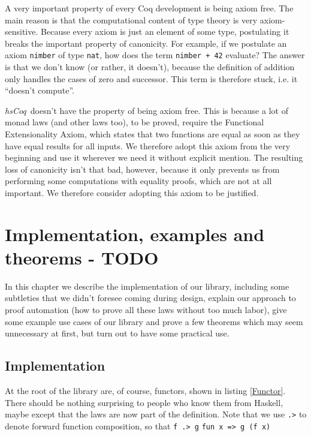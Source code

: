 \documentclass[declaration,inz,english,shortabstract]{iithesis}
\newcommand{\libname}{\textit{hsCoq}}
\newcommand{\m}[1]{\texttt{#1}}
\begin{document}
A very important property of every Coq development is being axiom free. The main reason is that the computational content of type theory is very axiom-sensitive. Because every axiom is just an element of some type, postulating it breaks the important property of canonicity. For example, if we postulate an axiom \m{nimber} of type \m{nat}, how does the term \m{nimber + 42} evaluate? The answer is that we don't know (or rather, it doesn't), because the definition of addition only handles the cases of zero and successor. This term is therefore stuck, i.e. it ``doesn't compute''.

\libname\ doesn't have the property of being axiom free. This is because a lot of monad laws (and other laws too), to be proved, require the Functional Extensionality Axiom, which states that two functions are equal as soon as they have equal results for all inputs. We therefore adopt this axiom from the very beginning and use it wherever we need it without explicit mention. The resulting loss of canonicity isn't that bad, however, because it only prevents us from performing some computations with equality proofs, which are not at all important. We therefore consider adopting this axiom to be justified.

\chapter{Implementation, examples and theorems - TODO}

In this chapter we describe the implementation of our library, including some subtleties that we didn't foresee coming during design, explain our approach to proof automation (how to prove all these laws without too much labor), give some example use cases of our library and prove a few theorems which may seem unnecessary at first, but turn out to have some practical use.

\section{Implementation}


At the root of the library are, of course, functors, shown in listing \ref{Functor}. There should be nothing surprising to people who know them from Haskell, maybe except that the laws are now part of the definition. Note that we use \m{.>} to denote forward function composition, so that \m{f .> g} \m{fun x => g (f x)}
\end{document}
